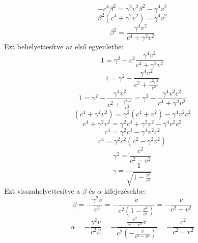 \documentclass[a4paper,12pt]{article}
\begin{document}
\begin{equation}
    -c^4 \beta^2 = \gamma^2 v^2 \beta^2 - \gamma^4 v^2
\end{equation}
\begin{equation}
    \beta^2 (c^4 + \gamma^2 v^2) = \gamma^4 v^2
\end{equation}
\begin{equation}
    \beta^2 = \frac{\gamma^4 v^2}{c^4 + \gamma^2 v^2}
\end{equation}
Ezt behelyettesítve az első egyenletbe:
\begin{equation}
    1 = \gamma^2 - c^2 \frac{\gamma^4 v^2}{c^4 + \gamma^2 v^2}
\end{equation}
\begin{equation}
    1 = \gamma^2 - \frac{\gamma^4 v^2}{c^2 + \frac{\gamma^2 v^2}{c^2}}
\end{equation}
\begin{equation}
    1 = \gamma^2 - \frac{\gamma^4 v^2}{c^2 + \frac{\gamma^2 v^2}{c^2}} = \gamma^2 - \frac{\gamma^4 v^2 c^2}{c^4 + \gamma^2 v^2}
\end{equation}
\begin{equation}
    (c^4 + \gamma^2 v^2) = \gamma^2 (c^4 + v^2) - \gamma^4 v^2 c^2
\end{equation}
\begin{equation}
    c^4 + \gamma^2 v^2 = \gamma^2 c^4 + \gamma^2 v^2 - \gamma^4 v^2 c^2
\end{equation}
\begin{equation}
    c^4 = \gamma^2 c^4 - \gamma^4 v^2 c^2
\end{equation}
\begin{equation}
    c^4 = \gamma^2 c^2 (c^2 - \gamma^2 v^2)
\end{equation}
\begin{equation}
    \gamma^2 = \frac{c^2}{c^2 - v^2}
\end{equation}
\begin{equation}
    \gamma = \frac{1}{\sqrt{1 - \frac{v^2}{c^2}}}
\end{equation}
Ezt visszahelyettesítve a $\beta$ és $\alpha$ kifejezésekbe:
\begin{equation}
    \beta = -\frac{\gamma^2 v}{c^2} = -\frac{v}{c^2 (1 - \frac{v^2}{c^2})} = -\frac{v}{c^2 - v^2}
\end{equation}
\begin{equation}
    \alpha = -\frac{\gamma^2 v}{c^2 \beta} = -\frac{\frac{c^2}{c^2 - v^2} v}{c^2 \left(-\frac{v}{c^2 - v^2}\right)} = -\frac{c^2}{c^2 - v^2}
\end{equation}
\end{document}
